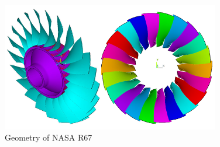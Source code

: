 \begin{figure}[h!]
\centering %
\includegraphics[width=0.85\textwidth]{Pictures/r67_over.png}
\caption{Geometry of NASA R67}
\label{r67over}
\end{figure}





